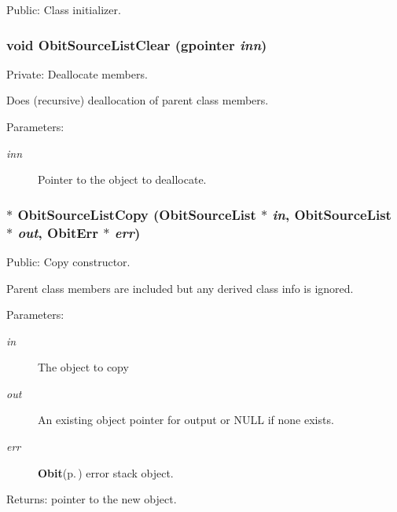 Public: Class initializer. 

\subsubsection{\setlength{\rightskip}{0pt plus 5cm}void Obit\-Source\-List\-Clear (gpointer {\em inn})}\label{ObitSourceList_8c_a4}


Private: Deallocate members. 

Does (recursive) deallocation of parent class members. \begin{Desc}
\item[Parameters:]
\begin{description}
\item[{\em inn}]Pointer to the object to deallocate. \end{description}
\end{Desc}
\subsubsection{$\ast$ Obit\-Source\-List\-Copy ({\bf Obit\-Source\-List} $\ast$ {\em in}, {\bf Obit\-Source\-List} $\ast$ {\em out}, {\bf Obit\-Err} $\ast$ {\em err})}\label{ObitSourceList_8c_a9}


Public: Copy constructor. 

Parent class members are included but any derived class info is ignored. \begin{Desc}
\item[Parameters:]
\begin{description}
\item[{\em in}]The object to copy \item[{\em out}]An existing object pointer for output or NULL if none exists. \item[{\em err}]{\bf Obit}{\rm (p.\,\pageref{structObit})} error stack object. \end{description}
\end{Desc}
\begin{Desc}
\item[Returns:]pointer to the new object. \end{Desc}
